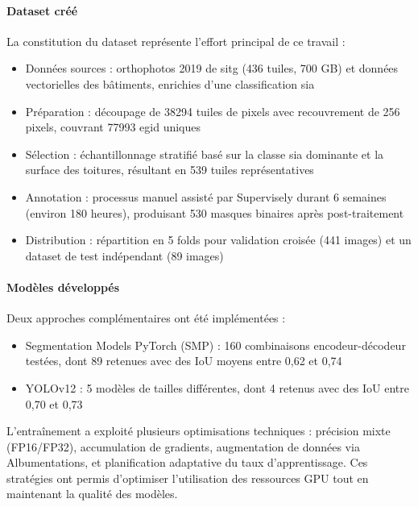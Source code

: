 \paragraph{Dataset créé}
La constitution du dataset représente l'effort principal de ce travail :
\begin{itemize}
    \item Données sources : orthophotos 2019 de \acrshort{sitg} (436 tuiles, 700 GB) et données vectorielles des bâtiments, enrichies d'une classification \gls{sia}
    \item Préparation : découpage de 38294 tuiles de \si{} pixels avec recouvrement de 256 pixels, couvrant 77993 \gls{egid} uniques
    \item Sélection : échantillonnage stratifié basé sur la classe \gls{sia} dominante et la surface des toitures, résultant en 539 tuiles représentatives
    \item Annotation : processus manuel assisté par Supervisely durant 6 semaines (environ 180 heures), produisant 530 masques binaires après post-traitement
    \item Distribution : répartition en 5 folds pour validation croisée (441 images) et un dataset de test indépendant (89 images)
\end{itemize}

\paragraph{Modèles développés}
Deux approches complémentaires ont été implémentées :
\begin{itemize}
    \item Segmentation Models PyTorch (SMP) : 160 combinaisons encodeur-décodeur testées, dont 89 retenues avec des IoU moyens entre 0,62 et 0,74
    \item YOLOv12 : 5 modèles de tailles différentes, dont 4 retenus avec des IoU entre 0,70 et 0,73
\end{itemize}

L'entraînement a exploité plusieurs optimisations techniques : précision mixte\\(FP16/FP32), accumulation de gradients, augmentation de données via Albumentations, et planification adaptative du taux d'apprentissage. Ces stratégies ont permis d'optimiser l'utilisation des ressources GPU tout en maintenant la qualité des modèles.


